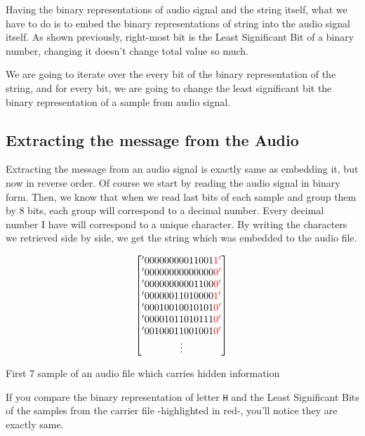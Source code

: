 \documentclass[twocolumns]{IEEEtran}
\begin{document}
	Having the binary representations of audio signal and the string itself, what we have to do is to embed the binary representations of string into the audio signal itself. As shown previously, right-most bit is the Least Significant Bit of a binary number, changing it doesn't change total value so much.
	
	We are going to iterate over the every bit of the binary representation of the string, and for every bit, we are going to change the least significant bit the binary representation of a sample from audio signal.
	
	\subsection{Extracting the message from the Audio}
	
	Extracting the message from an audio signal is exactly same as embedding it, but now in reverse order. Of course we start by reading the audio signal in binary form. Then, we know that when we read last bits of each sample and group them by 8 bits, each group will correspond to a decimal number. Every decimal number I have will correspond to a unique character. By writing the characters we retrieved side by side, we get the string which was embedded to the audio file.
	
	\begin{equation}
			\begin{bmatrix}
				'00000000011001\color{red}1' \\
				'00000000000000\color{red}0' \\
				'00000000001100\color{red}0' \\
				'00000011010000\color{red}1' \\
				'00010010010101\color{red}0' \\
				'00001011010111\color{red}0' \\
				'00100011001001\color{red}0' \\
			\vdots
			\end{bmatrix} \\ \\		
		\end{equation}
	\begin{center}
		First 7 sample of an audio file which carries hidden information
	\end{center}
	If you compare the binary representation of letter \texttt{H} and the Least Significant Bits of the samples from the carrier file -highlighted in red-, you'll notice they are exactly same.
	
\end{document}
